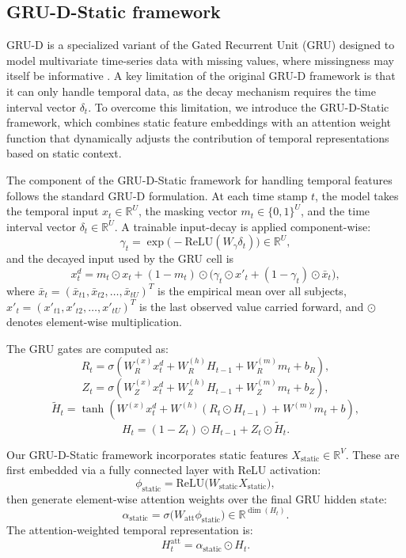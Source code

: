 \documentclass[fleqn,10pt]{wlscirep}
\begin{document}
\subsection*{GRU-D-Static framework}
GRU-D is a specialized variant of the Gated Recurrent Unit (GRU) designed to model multivariate time-series data with missing values, where missingness may itself be informative \cite{che2018recurrent}.  
A key limitation of the original GRU-D framework is that it can only handle temporal data, as the decay mechanism requires the time interval vector $\delta_t$.  
To overcome this limitation, we introduce the GRU-D-Static framework, which combines static feature embeddings with an attention weight function that dynamically adjusts the contribution of temporal representations based on static context\cite{shickel2022multi}.

The component of the GRU-D-Static framework for handling temporal features follows the standard GRU-D formulation.  
At each time stamp $t$, the model takes the temporal input $x_t \in \mathbb{R}^U$, the masking vector $m_t \in \{0,1\}^U$, and the time interval vector $\delta_t \in \mathbb{R}^U$.  
A trainable input-decay is applied component-wise:
$$
\gamma_t = \exp\!\big(-\mathrm{ReLU}(W_\gamma \delta_t)\big) \in \mathbb{R}^U,
$$
and the decayed input used by the GRU cell is
$$
x^d_t = m_t \odot x_t + (1 - m_t) \odot \Big( \gamma_t \odot x'_t + (1 - \gamma_t) \odot \bar{x}_{t} \Big),
$$
where $\bar{x}_{t} = (\bar{x}_{t1}, \bar{x}_{t2},\dots,\bar{x}_{tU})^T$ is the empirical mean over all subjects, $x'_t = (x'_{t1}, x'_{t2},\dots,x'_{tU})^T $ is the last observed value carried forward, and $\odot$ denotes element-wise multiplication.  

The GRU gates are computed as:
$$
R_t = \sigma\!\left(W_R^{(x)} x^d_t + W_R^{(h)} H_{t-1} + W_R^{(m)} m_t + b_R \right),
$$
$$
Z_t = \sigma\!\left(W_Z^{(x)} x^d_t + W_Z^{(h)} H_{t-1} + W_Z^{(m)} m_t + b_Z \right),
$$
$$
\tilde{H}_t = \tanh\!\left(W^{(x)} x^d_t + W^{(h)} (R_t \odot H_{t-1}) + W^{(m)} m_t + b \right),
$$
$$
H_t = (1 - Z_t) \odot H_{t-1} + Z_t \odot \tilde{H}_t.
$$

Our GRU-D-Static framework incorporates static features $X_{\text{static}} \in \mathbb{R}^V$.  
These are first embedded via a fully connected layer with ReLU activation:
$$
\phi_{\text{static}} = \mathrm{ReLU}\!\big(W_{\text{static}} X_{\text{static}}\big),
$$
then generate element-wise attention weights over the final GRU hidden state:
$$
\alpha_{\text{static}} = \sigma\!\big(W_{\text{att}} \phi_{\text{static}}\big) \in \mathbb{R}^{\dim(H_t)}.
$$
The attention-weighted temporal representation is:
$$
H_t^{\mathrm{att}} = \alpha_{\text{static}} \odot H_t.
$$
\end{document}

